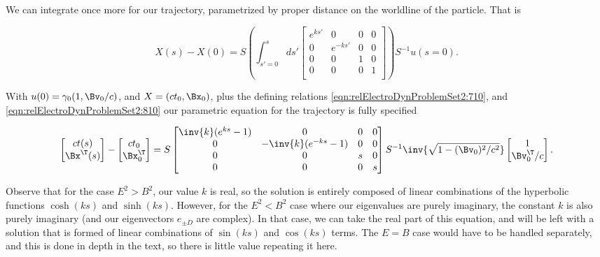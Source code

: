 We can integrate once more for our trajectory, parametrized by proper distance on the worldline of the particle.  That is

\begin{equation}\label{eqn:relElectroDynProblemSet2:890}
X(s) - X(0) 
= S \left( \int_{s'=0}^s 
ds'
\begin{bmatrix}
e^{ks'} & 0 & 0 & 0 \\
0 & e^{-ks'} & 0 & 0 \\
0 & 0 & 1 & 0 \\
0 & 0 & 0 & 1 \\
\end{bmatrix} \right) S^{-1} u(s=0).
\end{equation}

With $u(0) = \gamma_0 (1, \Bv_0/c)$, and $X = (c t_0, \Bx_0)$, plus the defining relations \ref{eqn:relElectroDynProblemSet2:710}, and \ref{eqn:relElectroDynProblemSet2:810} our parametric equation for the trajectory is fully specified

\begin{equation}\label{eqn:relElectroDynProblemSet2:910}
\begin{bmatrix}
c t(s) \\
\Bx^\T(s)
\end{bmatrix}
- 
\begin{bmatrix}
c t_0 \\
\Bx_0^\T
\end{bmatrix}
= S 
\begin{bmatrix}
\inv{k}(e^{ks} -1) & 0 & 0 & 0 \\
0 & -\inv{k}(e^{-ks} -1) & 0 & 0 \\
0 & 0 & s & 0 \\
0 & 0 & 0 & s \\
\end{bmatrix} S^{-1} \inv{\sqrt{1 - (\Bv_0)^2/c^2}}
\begin{bmatrix}
1 \\
\Bv_0^\T/c
\end{bmatrix}.
\end{equation}

Observe that for the case $E^2 > B^2$, our value $k$ is real, so the solution is entirely composed of linear combinations of the hyperbolic functions $\cosh(k s)$ and $\sinh(ks)$.  However, for the $E^2 < B^2$ case where our eigenvalues are purely imaginary, the constant $k$ is also purely imaginary (and our eigenvectors $e_{\pm D}$ are complex).  In that case, we can take the real part of this equation, and will be left with a solution that is formed of linear combinations of $\sin(ks)$ and $\cos(ks)$ terms.  The $E = B$ case would have to be handled separately, and this is done in depth in the text, so there is little value repeating it here.


